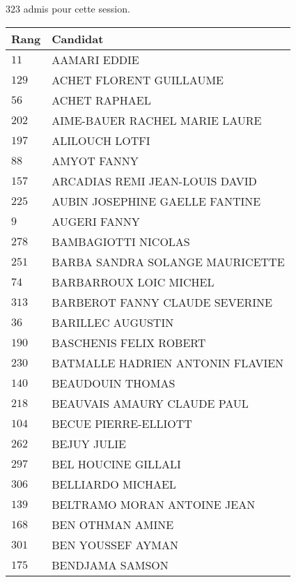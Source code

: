 




  $323$ admis pour cette session.

  \begin{xltabular}{\linewidth}{|l|X|}
    \hline
    \textbf{Rang} & \textbf{Candidat} \\
    \hline
    $11$ & AAMARI EDDIE \\
    \hline
    $129$ & ACHET FLORENT GUILLAUME \\
    \hline
    $56$ & ACHET RAPHAEL \\
    \hline
    $202$ & AIME-BAUER RACHEL MARIE LAURE \\
    \hline
    $197$ & ALILOUCH LOTFI \\
    \hline
    $88$ & AMYOT FANNY \\
    \hline
    $157$ & ARCADIAS REMI JEAN-LOUIS DAVID \\
    \hline
    $225$ & AUBIN JOSEPHINE GAELLE FANTINE \\
    \hline
    $9$ & AUGERI FANNY \\
    \hline
    $278$ & BAMBAGIOTTI NICOLAS \\
    \hline
    $251$ & BARBA SANDRA SOLANGE MAURICETTE \\
    \hline
    $74$ & BARBARROUX LOIC MICHEL \\
    \hline
    $313$ & BARBEROT FANNY CLAUDE SEVERINE \\
    \hline
    $36$ & BARILLEC AUGUSTIN \\
    \hline
    $190$ & BASCHENIS FELIX ROBERT \\
    \hline
    $230$ & BATMALLE HADRIEN ANTONIN FLAVIEN \\
    \hline
    $140$ & BEAUDOUIN THOMAS \\
    \hline
    $218$ & BEAUVAIS AMAURY CLAUDE PAUL \\
    \hline
    $104$ & BECUE PIERRE-ELLIOTT \\
    \hline
    $262$ & BEJUY JULIE \\
    \hline
    $297$ & BEL HOUCINE GILLALI \\
    \hline
    $306$ & BELLIARDO MICHAEL \\
    \hline
    $139$ & BELTRAMO MORAN ANTOINE JEAN \\
    \hline
    $168$ & BEN OTHMAN AMINE \\
    \hline
    $301$ & BEN YOUSSEF AYMAN \\
    \hline
    $175$ & BENDJAMA SAMSON \\

\end{xltabular}
